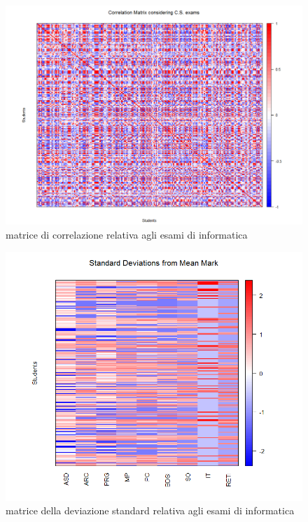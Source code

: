                \begin{figure}
                    \centering
                    \caption{matrice di correlazione relativa agli esami di informatica}
                    \label{esami_inf_corr}
                	\includegraphics[scale=0.32]{img/corr_matrix_2.png}
                \end{figure}

                \begin{figure}
                    \centering
                    \caption{matrice della deviazione standard relativa agli esami di informatica}
                    \label{esami_inf_stddev}
                	\includegraphics[scale=0.32]{img/std_dev_matrix_2.png}
                \end{figure}

